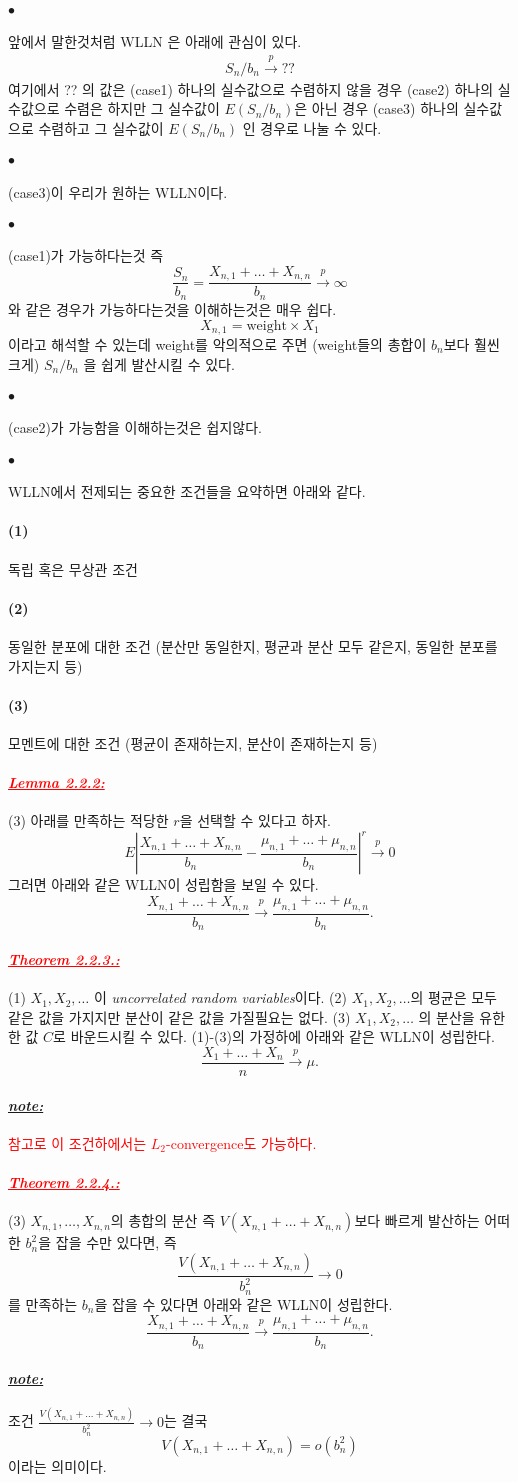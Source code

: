 \documentclass[12pt,oneside,english,a4paper]{article}
\def\ck{\paragraph{\Large$\bullet$}\Large}
\def\note{\paragraph{\Large\textit{\underline{note:}}}\Large}
\newcommand{\parared}[1]{\paragraph{\Large\textcolor{red}{\it\underline{\textbf{#1:}}}}\Large}
\def\one{\paragraph{\Large(1)}\Large}
\def\two{\paragraph{\Large(2)}\Large}
\def\three{\paragraph{\Large(3)}\Large}
\begin{document}
\ck 앞에서 말한것처럼 WLLN 은 아래에 관심이 있다. 
\begin{align*}
S_n / b_n \overset{p}{\to} ??
\end{align*}
여기에서 ?? 의 값은 (case1) 하나의 실수값으로 수렴하지 않을 경우 (case2) 하나의 실수값으로 수렴은 하지만 그 실수값이 $E(S_n/b_n)$은 아닌 경우 (case3) 하나의 실수값으로 수렴하고 그 실수값이 $E(S_n/b_n)$ 인 경우로 나눌 수 있다. 

\ck (case3)이 우리가 원하는 WLLN이다. 

\ck (case1)가 가능하다는것 즉 
\[
\frac{S_n}{b_n}=\frac{X_{n,1}+\dots+X_{n,n}}{b_n} \overset{p}{\to} \infty
\]
와 같은 경우가 가능하다는것을 이해하는것은 매우 쉽다.
\[
X_{n,1}=\mbox{weight} \times X_1
\]
이라고 해석할 수 있는데 weight를 악의적으로 주면 (weight들의 총합이 $b_n$보다 훨씬 크게) $S_n/b_n$ 을 쉽게 발산시킬 수 있다. 

\ck (case2)가 가능함을 이해하는것은 쉽지않다. 

\ck WLLN에서 전제되는 중요한 조건들을 요약하면 아래와 같다. 
\one 독립 혹은 무상관 조건
\two 동일한 분포에 대한 조건 (분산만 동일한지, 평균과 분산 모두 같은지, 동일한 분포를 가지는지 등)
\three 모멘트에 대한 조건 (평균이 존재하는지, 분산이 존재하는지 등)

\parared{Lemma 2.2.2} (3) 아래를 만족하는 적당한 $r$을 선택할 수 있다고 하자. 
\[
E\left|\frac{X_{n,1}+\dots+X_{n,n}}{b_n}-\frac{\mu_{n,1}+\dots+\mu_{n,n}}{b_n}\right|^r \overset{p}{\to} 0
\]
그러면 아래와 같은 WLLN이 성립함을 보일 수 있다. 
\[
\frac{X_{n,1}+\dots+X_{n,n}}{b_n} \overset{p}{\to} \frac{\mu_{n,1}+\dots+\mu_{n,n}}{b_n}.
\]

\parared{Theorem 2.2.3.} 
(1) $X_1,X_2,\dots $ 이 \emph{uncorrelated random variables}이다.
(2) $X_1,X_2,\dots $의 평균은 모두 같은 값을 가지지만 분산이 같은 값을 가질필요는 없다. (3) $X_1,X_2,\dots$ 의 분산을 유한한 값 $C$로 바운드시킬 수 있다. 
(1)-(3)의 가정하에 아래와 같은 WLLN이 성립한다. 
\[
\frac{X_1+\dots+X_n}{n} \overset{p}{\to} \mu.
\]

\note \textcolor{red}{참고로 이 조건하에서는 $L_2$-convergence도 가능하다.}

\parared{Theorem 2.2.4.} (3) $X_{n,1},\dots,X_{n,n}$의 총합의 분산 즉 $V(X_{n,1}+\dots+X_{n,n})$보다 빠르게 발산하는 어떠한 $b_n^2$을 잡을 수만 있다면, 즉 
\[
\frac{V(X_{n,1}+\dots+X_{n,n})}{b_n^2} \to 0
\]
를 만족하는 $b_n$을 잡을 수 있다면 아래와 같은 WLLN이 성립한다. 
\[
\frac{X_{n,1}+\dots+X_{n,n}}{b_n} \overset{p}{\to} \frac{\mu_{n,1}+\dots+\mu_{n,n}}{b_n}.
\]

\note 조건 $\frac{V(X_{n,1}+\dots+X_{n,n})}{b_n^2} \to 0$는 결국 
\[
V(X_{n,1}+\dots+X_{n,n})=o(b_n^2)
\]
이라는 의미이다. 
\end{document}
